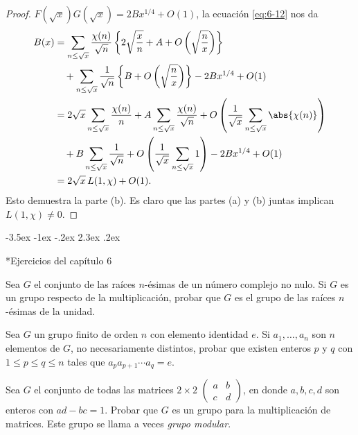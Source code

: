 \documentclass[12pt,a4paper]{book}
\makeatletter
\renewcommand\section{\@startsection{section}{1}{\z@}%
  {-3.5ex \@plus -1ex \@minus -.2ex}%
  {2.3ex \@plus .2ex}%
  {\normalfont\Large\bfseries\raggedright}}
\makeatother
\begin{document}
\begin{proof}
        $F(\sqrt{x})G(\sqrt{x})=2Bx^{1/4}+O(1)$, la ecuación \eqref{eq:6-12} nos da
        \begin{align*}
            B(x)&=\sum_{n\leq\sqrt{x}}\frac{\chi(n)}{\sqrt{n}}\left\{2\sqrt{\frac{x}{n}}+A
            +O\left(\sqrt{\frac{n}{x}}\right)\right\}\\
            &\quad+\sum_{n\leq\sqrt{x}}\frac{1}{\sqrt{n}}\left\{B+O\left(\sqrt{\frac{n}{x}}\right)\right\}
            -2Bx^{1/4}+O(1)\\
            &=2\sqrt{x}\sum_{n\leq\sqrt{x}}\frac{\chi(n)}{n}+A\sum_{n\leq\sqrt{x}}\frac{\chi(n)}{\sqrt{n}}
            +O\left(\frac{1}{\sqrt{x}}\sum_{n\leq\sqrt{x}}\abs{\chi(n)}\right)\\
            &\quad+B\sum_{n\leq\sqrt{x}}\frac{1}{\sqrt{n}}
            +O\left(\frac{1}{\sqrt{x}}\sum_{n\leq\sqrt{x}}1\right)-2Bx^{1/4}+O(1)\\
            &=2\sqrt{x}\,L(1,\chi)+O(1).
        \end{align*}
        Esto demuestra la parte (b). Es claro que las partes (a) y (b) juntas implican
        $L(1,\chi)\neq0$.
    \end{proof}

    \section*{Ejercicios del capítulo 6}

    \begin{ejercicio}
        Sea $G$ el conjunto de las raíces $n$-ésimas de un número complejo no nulo. Si $G$
        es un grupo respecto de la multiplicación, probar que $G$ es el grupo de las
        raíces $n$-ésimas de la unidad.
    \end{ejercicio}

    \begin{ejercicio}
        Sea $G$ un grupo finito de orden $n$ con elemento identidad $e$. Si
        $a_{1},\dots,a_{n}$ son $n$ elementos de $G$, no necesariamente distintos, probar que
        existen enteros $p$ y $q$ con $1\leq p\leq q\leq n$ tales que
        $a_{p}a_{p+1}\cdots a_{q}=e$.
    \end{ejercicio}

    \begin{ejercicio}
        Sea $G$ el conjunto de todas las matrices $2\times2$
        $\begin{pmatrix}a&b\\c&d\end{pmatrix}$, en donde $a,b,c,d$ son enteros con
        $ad-bc=1$. Probar que $G$ es un grupo para la multiplicación de matrices. Este
        grupo se llama a veces \textit{grupo modular}.
    \end{ejercicio}
\end{document}
